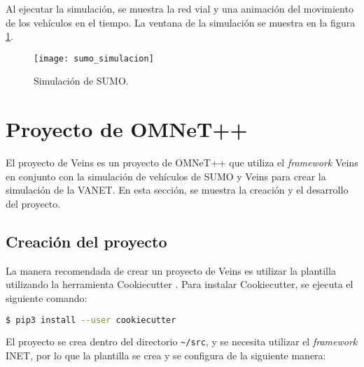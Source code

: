 Al ejecutar la simulación, se muestra la red vial y una animación del
movimiento de los vehículos en el tiempo. La ventana de la simulación se muestra
en la figura \ref{fig:sumo_simulacion}.

\begin{figure}[th!]
\centering
\texttt{[image: sumo\_simulacion]}
\decoRule
\caption[Simulación de SUMO]{Simulación de SUMO.}
\label{fig:sumo_simulacion}
\end{figure}


\section{Proyecto de OMNeT++}

\label{sec:proyecto_omnet}

El proyecto de Veins es un proyecto de OMNeT++ que utiliza el
\textit{framework} Veins en conjunto con la simulación de vehículos de SUMO y
Veins para crear la simulación de la VANET. En esta sección, se muestra la
creación y el desarrollo del proyecto.


\subsection{Creación del proyecto}

\label{subsec:creacion_proyecto}

\begin{sloppypar}
La manera recomendada de crear un proyecto de Veins es utilizar la plantilla
 utilizando la herramienta Cookiecutter
\cite{Cookiecutter}. Para instalar Cookiecutter, se ejecuta el siguiente
comando:
\end{sloppypar}

\begin{lstlisting}[language=bash]
$ pip3 install --user cookiecutter
\end{lstlisting}

El proyecto  se crea dentro del directorio
{\lstinline[language=bash]!~/src!}, y se necesita utilizar el
\textit{framework} INET, por lo que la plantilla se crea y se configura de la
siguiente manera:

